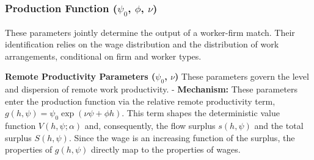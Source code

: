 \documentclass[
  11pt,
  letterpaper,
  DIV=11,
  numbers=noendperiod]{scrartcl}
\begin{document}
\subsubsection{\texorpdfstring{\textbf{Production Function
(\(\psi_{0}\), \(\phi\),
\(\nu\))}}{Production Function (\textbackslash psi\_\{0\}, \textbackslash phi, \textbackslash nu)}}\label{production-function-psi_0-phi-nu}

These parameters jointly determine the output of a worker-firm match.
Their identification relies on the wage distribution and the
distribution of work arrangements, conditional on firm and worker types.

\textbf{Remote Productivity Parameters (\(\psi_{0}\), \(\nu\))} These
parameters govern the level and dispersion of remote work productivity.
- \textbf{Mechanism:} These parameters enter the production function via
the relative remote productivity term,
\(g(h, \psi) = \psi_0 \exp(\nu\psi + \phi h)\). This term shapes the
deterministic value function \(V(h, \psi; \alpha)\) and, consequently,
the flow surplus \(s(h, \psi)\) and the total surplus \(S(h, \psi)\).
Since the wage is an increasing function of the surplus, the properties
of \(g(h, \psi)\) directly map to the properties of wages.
\end{document}
